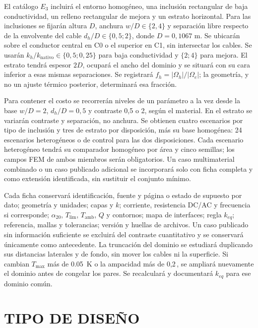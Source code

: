 El catálogo $E_3$ incluirá el entorno homogéneo, una inclusión rectangular de baja conductividad, un relleno rectangular de mejora y un estrato horizontal. Para las inclusiones se fijarán altura $D$, anchura $w/D\in\{2,4\}$ y separación libre respecto de la envolvente del cable $d_h/D\in\{0{,}5;2\}$, donde $D=0{,}1067$ m. Se ubicarán sobre el conductor central en C0 o el superior en C1, sin intersectar los cables. Se usarán $k_h/k_{\mathrm{nativo}}\in\{0{,}5;0{,}25\}$ para baja conductividad y $\{2;4\}$ para mejora. El estrato tendrá espesor $2D$, ocupará el ancho del dominio y se situará con su cara inferior a esas mismas separaciones. Se registrará $f_h=|\Omega_h|/|\Omega_e|$; la geometría, y no un ajuste térmico posterior, determinará esa fracción.

Para contener el costo se recorrerán niveles de un parámetro a la vez desde la base $w/D=2$, $d_h/D=0{,}5$ y contraste 0,5 o 2, según el material. En el estrato se variarán contraste y separación, no anchura. Se obtienen cuatro escenarios por tipo de inclusión y tres de estrato por disposición, más su base homogénea: 24 escenarios heterogéneos o de control para las dos disposiciones. Cada escenario heterogéneo tendrá su comparador homogéneo por área y cinco semillas; los campos FEM de ambos miembros serán obligatorios. Un caso multimaterial combinado o un caso publicado adicional se incorporará solo con ficha completa y como extensión identificada, sin sustituir el conjunto mínimo.

Cada ficha conservará identificación, fuente y página o estado de supuesto por dato; geometría y unidades; capas y $k$; corriente, resistencia DC/AC y frecuencia si corresponde; $\alpha_{20}$, $T_{\mathrm{lim}}$, $T_{\mathrm{amb}}$, $Q$ y contornos; mapa de interfaces; regla $k_{eq}$; referencia, mallas y tolerancias; versión y huellas de archivos. Un caso publicado sin información suficiente se excluirá del contraste cuantitativo y se conservará únicamente como antecedente. La truncación del dominio se estudiará duplicando sus distancias laterales y de fondo, sin mover los cables ni la superficie. Si cambian $T_{\max}$ más de \SI{0.05}{\kelvin} o la ampacidad más de 0,2\,\pct{}, se ampliará nuevamente el dominio antes de congelar los pares. Se recalculará y documentará $k_{eq}$ para ese dominio común.

\section{TIPO DE DISEÑO}

